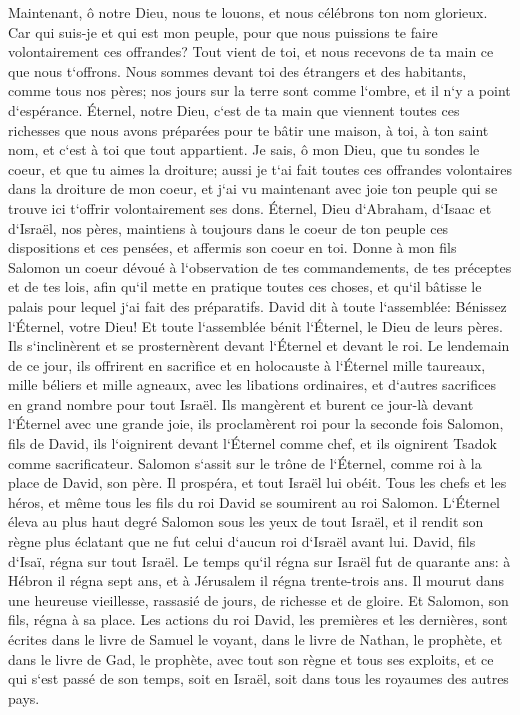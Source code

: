 \verse Maintenant, ô notre Dieu, nous te louons, et nous célébrons ton nom glorieux. 
\verse Car qui suis-je et qui est mon peuple, pour que nous puissions te faire volontairement ces offrandes? Tout vient de toi, et nous recevons de ta main ce que nous t`offrons. 
\verse Nous sommes devant toi des étrangers et des habitants, comme tous nos pères; nos jours sur la terre sont comme l`ombre, et il n`y a point d`espérance. 
\verse Éternel, notre Dieu, c`est de ta main que viennent toutes ces richesses que nous avons préparées pour te bâtir une maison, à toi, à ton saint nom, et c`est à toi que tout appartient. 
\verse Je sais, ô mon Dieu, que tu sondes le coeur, et que tu aimes la droiture; aussi je t`ai fait toutes ces offrandes volontaires dans la droiture de mon coeur, et j`ai vu maintenant avec joie ton peuple qui se trouve ici t`offrir volontairement ses dons. 
\verse Éternel, Dieu d`Abraham, d`Isaac et d`Israël, nos pères, maintiens à toujours dans le coeur de ton peuple ces dispositions et ces pensées, et affermis son coeur en toi. 
\verse Donne à mon fils Salomon un coeur dévoué à l`observation de tes commandements, de tes préceptes et de tes lois, afin qu`il mette en pratique toutes ces choses, et qu`il bâtisse le palais pour lequel j`ai fait des préparatifs. 
\verse David dit à toute l`assemblée: Bénissez l`Éternel, votre Dieu! Et toute l`assemblée bénit l`Éternel, le Dieu de leurs pères. Ils s`inclinèrent et se prosternèrent devant l`Éternel et devant le roi. 
\verse Le lendemain de ce jour, ils offrirent en sacrifice et en holocauste à l`Éternel mille taureaux, mille béliers et mille agneaux, avec les libations ordinaires, et d`autres sacrifices en grand nombre pour tout Israël. 
\verse Ils mangèrent et burent ce jour-là devant l`Éternel avec une grande joie, ils proclamèrent roi pour la seconde fois Salomon, fils de David, ils l`oignirent devant l`Éternel comme chef, et ils oignirent Tsadok comme sacrificateur. 
\verse Salomon s`assit sur le trône de l`Éternel, comme roi à la place de David, son père. Il prospéra, et tout Israël lui obéit. 
\verse Tous les chefs et les héros, et même tous les fils du roi David se soumirent au roi Salomon. 
\verse L`Éternel éleva au plus haut degré Salomon sous les yeux de tout Israël, et il rendit son règne plus éclatant que ne fut celui d`aucun roi d`Israël avant lui. 
\verse David, fils d`Isaï, régna sur tout Israël. 
\verse Le temps qu`il régna sur Israël fut de quarante ans: à Hébron il régna sept ans, et à Jérusalem il régna trente-trois ans. 
\verse Il mourut dans une heureuse vieillesse, rassasié de jours, de richesse et de gloire. Et Salomon, son fils, régna à sa place. 
\verse Les actions du roi David, les premières et les dernières, sont écrites dans le livre de Samuel le voyant, dans le livre de Nathan, le prophète, et dans le livre de Gad, le prophète, 
\verse avec tout son règne et tous ses exploits, et ce qui s`est passé de son temps, soit en Israël, soit dans tous les royaumes des autres pays. 
